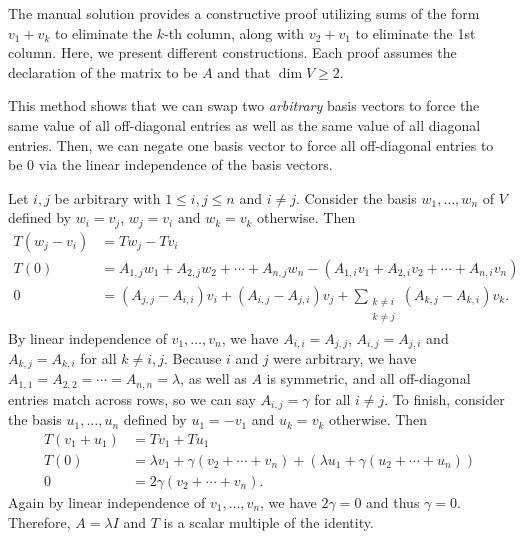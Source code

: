 
The manual solution provides a constructive proof utilizing sums of the form $v_1 + v_k$ to eliminate the $k$-th column, along with $v_2 + v_1$ to eliminate the 1st column.
Here, we present different constructions.
Each proof assumes the declaration of the matrix to be $A$ and that $\dim V \geq 2$.

This method shows that we can swap two \emph{arbitrary} basis vectors to force the same value of all off-diagonal entries as well as the same value of all diagonal entries.
Then, we can negate one basis vector to force all off-diagonal entries to be 0 via the linear independence of the basis vectors.

\begin{coole}
    Let $i,j$ be arbitrary with $1 \leq i,j \leq n$ and $i \neq j$.
    Consider the basis $w_1, \dots, w_n$ of $V$ defined by $w_i = v_j$, $w_j = v_i$ and $w_k = v_k$ otherwise.
    Then 
    \begin{align*}
        T(w_j - v_i) &= Tw_j - Tv_i \\
        T(0) &= A_{1,j}w_1 + A_{2,j}w_2 + \cdots + A_{n,j}w_n - (A_{1,i}v_1 + A_{2,i}v_2 + \cdots + A_{n,i}v_n) \\
        0 &= (A_{j,j} - A_{i,i})v_i + (A_{i,j} - A_{j,i})v_j + \sum_{\substack{k \neq i \\ k \neq j}}(A_{k,j} - A_{k,i})v_k.
    \end{align*}
    By linear independence of $v_1, \dots, v_n$, we have $A_{i,i} = A_{j,j}$, $A_{i,j} = A_{j,i}$ and $A_{k,j} = A_{k,i}$ for all $k \neq i,j$.
    Because $i$ and $j$ were arbitrary, we have $A_{1,1} = A_{2,2} = \cdots = A_{n,n} = \lambda$, as well as $A$ is symmetric, and all off-diagonal entries match across rows, so we can say $A_{i,j} = \gamma$ for all $i \neq j$.
    To finish, consider the basis $u_1, \dots, u_n$ defined by $u_1 = -v_1$ and $u_k = v_k$ otherwise.
    Then 
    \begin{align*}
        T(v_1 + u_1) &= Tv_1 + Tu_1 \\
        T(0) &= \lambda v_1 + \gamma(v_2 + \cdots + v_n) + (\lambda u_1 + \gamma(u_2 + \cdots + u_n)) \\
        0 &= 2\gamma(v_2 + \cdots + v_n).
    \end{align*}
    Again by linear independence of $v_1, \dots, v_n$, we have $2\gamma = 0$ and thus $\gamma = 0$.
    Therefore, $A = \lambda I$ and $T$ is a scalar multiple of the identity.
\end{coole}


